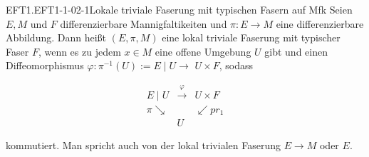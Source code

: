 \begin{DEF}{EFT1.EFT1-1-02-1}{Lokale triviale Faserung mit typischen Fasern auf Mfk}
Seien $E, M$ und $F$ differenzierbare Mannigfaltikeiten und $\pi: E \rightarrow M$ eine differenzierbare Abbildung. Dann heißt $(E, \pi, M)$ eine lokal triviale Faserung mit typischer Faser $F$, wenn es zu jedem $x \in M$ eine offene Umgebung $U$ gibt und einen Diffeomorphismus $\varphi: \pi^{-1}(U):=E \mid U \rightarrow$ $U \times F$, sodass

    $$
    \begin{array}{lll}
    E \mid U & \xrightarrow{\varphi} & U \times F \\
    \pi \searrow & & \swarrow p r_1 \\
    & U &
    \end{array}
    $$
    
    kommutiert. Man spricht auch von der lokal trivialen Faserung $E \rightarrow M$ oder $E$.
\end{DEF}
